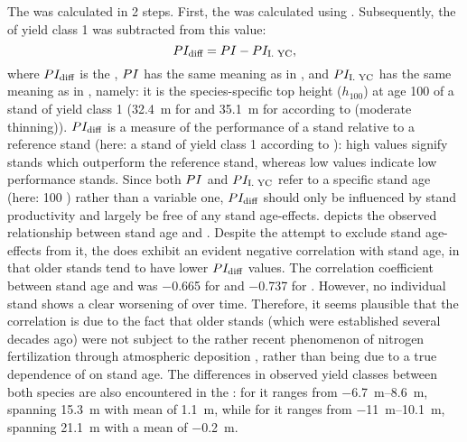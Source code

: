 The \ProductivityIndexVariableText{} was calculated in 2 steps.  First, the \ProductivityIndexText{} was calculated using .  Subsequently, the \ProductivityIndexText{} of yield class 1 was subtracted from this value:
\begin{equation}
  \label{eq:ProductivityIndexVariable}
  PI_{\text{diff}}{} = PI{} - PI_{\text{I. YC}}{},
\end{equation}
where \(PI_{\text{diff}}{}\) is the \ProductivityIndexVariableText{}, \(PI{}\) has the same meaning as in , and \(PI_{\text{I. YC}}{}\) has the same meaning as in , namely: it is the species-specific top height (\(h_{100}\)) at age \SI{100}{\year} of a stand of yield class 1 (\SI{32.4}{\meter} for \Beech{} and \SI{35.1}{\meter} for \Spruce{} according to \textcite{Schober1995} (moderate thinning)).  \(PI_{\text{diff}}{}\) is a measure of the performance of a stand relative to a reference stand (here: a stand of yield class 1 according to \textcite{Schober1995}): high values signify stands which outperform the reference stand, whereas low values indicate low performance stands.  Since both \(PI{}\) and \(PI_{\text{I. YC}}{}\) refer to a specific stand age (here: 100 \si{\year}) rather than a variable one, \(PI_{\text{diff}}{}\) should only be influenced by stand productivity and largely be free of any stand age-effects.   depicts the observed relationship between stand age and \ProductivityIndexVariableText{}.  Despite the attempt to exclude stand age-effects from it, the \ProductivityIndexVariableText{} does exhibit an evident negative correlation with stand age, in that older stands tend to have lower \(PI_{\text{diff}}{}\) values. The correlation coefficient between stand age and \ProductivityIndexVariableText{} was \num{-0.665} for \Beech{} and \num{-0.737} for \Spruce{}.  However, no individual stand shows a clear worsening of \ProductivityIndexVariableText{} over time.  Therefore, it seems plausible that the correlation is due to the fact that older stands (which were established several decades ago) were not subject to the rather recent phenomenon of nitrogen fertilization through atmospheric deposition \parencite{Kenk1988}, rather than being due to a true dependence of \ProductivityIndexVariableText{} on stand age.  The differences in observed yield classes between both species are also encountered in the \ProductivityIndexVariableText{}:  for \Beech{} it ranges from \SIrange{-6.7}{8.6}{\meter}, spanning \SI{15.3}{\meter} with mean of \SI{1.1}{\meter}, while for \Spruce{} it ranges from \SIrange{-11}{10.1}{\meter}, spanning \SI{21.1}{\meter} with a mean of \SI{-0.2}{\meter}.

